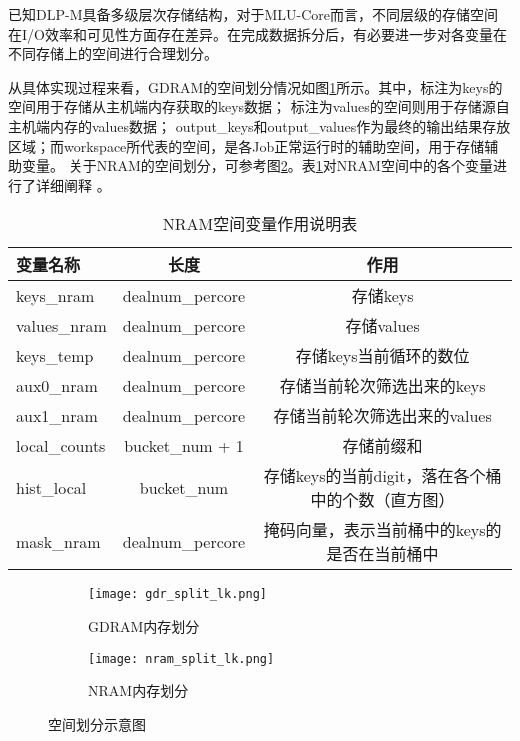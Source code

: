 已知DLP-M具备多级层次存储结构，对于MLU-Core而言，不同层级的存储空间在I/O效率和可见性方面存在差异。在完成数据拆分后，有必要进一步对各变量在不同存储上的空间进行合理划分。

从具体实现过程来看，GDRAM的空间划分情况如图\ref{fig:gdr_split_lk}所示。其中，标注为keys的空间用于存储从主机端内存获取的keys数据；
标注为values的空间则用于存储源自主机端内存的values数据；
output\_keys和output\_values作为最终的输出结果存放区域；而workspace所代表的空间，是各Job正常运行时的辅助空间，用于存储辅助变量。
关于NRAM的空间划分，可参考图\ref{fig:nram_split_lk}。表\ref{tab:nram_var}对NRAM空间中的各个变量进行了详细阐释 。 
\begin{table}
    \caption{NRAM空间变量作用说明表}
    \centering
    \begin{tabular}{lcc}
    \toprule
    变量名称 & 长度 & 作用 \\
    \midrule
    keys\_nram & dealnum\_percore & 存储keys \\
    values\_nram & dealnum\_percore & 存储values \\
    keys\_temp & dealnum\_percore & 存储keys当前循环的数位 \\
    aux0\_nram & dealnum\_percore & 存储当前轮次筛选出来的keys \\
    aux1\_nram & dealnum\_percore &  存储当前轮次筛选出来的values\\
    local\_counts & bucket\_num + 1 & 存储前缀和 \\
    hist\_local & bucket\_num & 存储keys的当前digit，落在各个桶中的个数（直方图） \\
    mask\_nram & dealnum\_percore & 掩码向量，表示当前桶中的keys的是否在当前桶中 \\
    \bottomrule
    \end{tabular}
    \label{tab:nram_var}
\end{table}



\begin{figure}[htbp]
    \centering
    \begin{subfigure}[b]{\textwidth}
        \centering
        \texttt{[image: gdr\_split\_lk.png]}
        \caption{GDRAM内存划分}
        \label{fig:gdr_split_lk}
    \end{subfigure}
    
    \vspace{1em} %

    \begin{subfigure}[b]{\textwidth}
        \centering
        \texttt{[image: nram\_split\_lk.png]}
    \caption{NRAM内存划分}
    \label{fig:nram_split_lk}
    \end{subfigure}
    
    \caption{空间划分示意图}
    \label{fig:images}
\end{figure}





